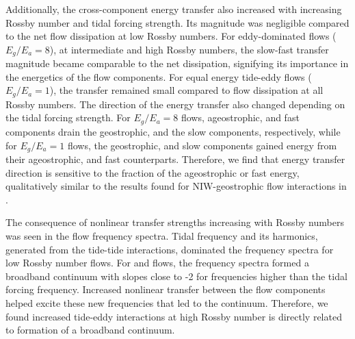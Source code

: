 \documentclass[../Rajarshi-thesis-draft.tex]{subfiles}
\begin{document}
	Additionally, the cross-component energy transfer also increased with increasing Rossby number and tidal forcing strength. Its magnitude was negligible compared to the net flow dissipation at low Rossby numbers. For eddy-dominated flows ($E_g/E_a = 8$), at intermediate and high Rossby numbers, the slow-fast transfer magnitude became comparable to the net dissipation, signifying its importance in the energetics of the flow components. For equal energy tide-eddy flows ($E_g/E_a =1$), the transfer remained small compared to flow dissipation at all Rossby numbers.
	The direction of the energy transfer also changed depending on the tidal forcing strength. For $E_g/E_a = 8$ flows, ageostrophic, and fast components drain the geostrophic, and the slow components, respectively, while for $E_g/E_a = 1$ flows, the geostrophic, and slow components gained energy from their ageostrophic, and fast counterparts. Therefore, we find that energy transfer direction is sensitive to the fraction of the ageostrophic or fast energy, qualitatively similar to the results found for  NIW-geostrophic flow interactions in \citet{TD20}. 
    
	The consequence of nonlinear transfer strengths  increasing with Rossby numbers was seen in the flow frequency spectra. Tidal frequency and its harmonics, generated from the tide-tide interactions, dominated the frequency spectra for low Rossby number \lr flows. For \ir and \hr flows, the frequency spectra formed a broadband continuum with slopes close to -2 for frequencies higher than the tidal forcing frequency. Increased nonlinear transfer between the flow components helped excite these new frequencies that led to the continuum. Therefore, we found  increased tide-eddy interactions at high Rossby number is directly related to formation of a broadband continuum. %
	
\end{document}
